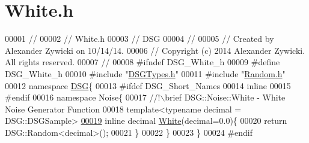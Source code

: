\hypertarget{_white_8h_source}{\section{White.\+h}
\label{_white_8h_source}
}

\begin{DoxyCode}
00001 \textcolor{comment}{//}
00002 \textcolor{comment}{//  White.h}
00003 \textcolor{comment}{//  DSG}
00004 \textcolor{comment}{//}
00005 \textcolor{comment}{//  Created by Alexander Zywicki on 10/14/14.}
00006 \textcolor{comment}{//  Copyright (c) 2014 Alexander Zywicki. All rights reserved.}
00007 \textcolor{comment}{//}
00008 \textcolor{preprocessor}{#ifndef DSG\_White\_h}
00009 \textcolor{preprocessor}{#define DSG\_White\_h}
00010 \textcolor{preprocessor}{#include "\hyperlink{_d_s_g_types_8h}{DSGTypes.h}"}
00011 \textcolor{preprocessor}{#include "\hyperlink{_random_8h}{Random.h}"}
00012 \textcolor{keyword}{namespace }\hyperlink{namespace_d_s_g}{DSG}\{
00013 \textcolor{preprocessor}{#ifdef DSG\_Short\_Names}
00014     \textcolor{keyword}{inline}
00015 \textcolor{preprocessor}{#endif}
00016     \textcolor{keyword}{namespace }Noise\{\textcolor{comment}{}
00017 \textcolor{comment}{        //!\(\backslash\)brief DSG::Noise::White - White Noise Generator Function}
00018 \textcolor{comment}{}        \textcolor{keyword}{template}<\textcolor{keyword}{typename} decimal = DSG::DSGSample>
\hypertarget{_white_8h_source_l00019}{}\hyperlink{namespace_d_s_g_1_1_noise_a0d1c4b4522d2e56b1aa604e45ab92066}{00019}         \textcolor{keyword}{inline} decimal \hyperlink{namespace_d_s_g_1_1_noise_a0d1c4b4522d2e56b1aa604e45ab92066}{White}(decimal=0.0)\{
00020             \textcolor{keywordflow}{return} DSG::Random<decimal>();
00021         \}
00022     \}
00023 \}
00024 \textcolor{preprocessor}{#endif}
\end{DoxyCode}
